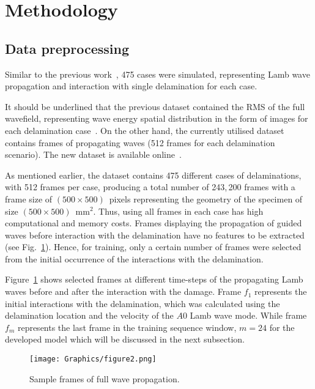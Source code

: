 \documentclass{IOS-Book-Article}
\begin{document}
\section{Methodology}

\subsection{Data preprocessing}
Similar to the previous work~\cite{Ijjeh2021}, 475 cases were simulated, representing Lamb wave propagation and interaction with single delamination for each case. 

It should be underlined that the previous dataset contained the RMS of the full wavefield, representing wave energy spatial distribution in the form of images for each delamination case~\cite{Kudela2020d}.
On the other hand, the currently utilised dataset contains frames of propagating waves (512 frames for each delamination scenario).
The new dataset is available online~\cite{Kudela2021}.

As mentioned earlier, the dataset contains 475 different cases of delaminations, with 512 frames per case, producing a total number of 243,\,200 frames with a frame size of \((500\times500)\)~pixels representing the geometry of the specimen of size \((500\times500)\)~mm\(^{2}\).
Thus, using all frames in each case has high computational and memory costs.
Frames displaying the propagation of guided waves before interaction with the delamination have no features to be extracted (see Fig.~\ref{fig:Full_wave}).
Hence, for training, only a certain number of frames were selected from the initial occurrence of the interactions with the delamination.

Figure~\ref{fig:Full_wave} shows selected frames at different time-steps of the propagating Lamb waves before and after the interaction with the damage.
Frame \(f_{1}\) represents the initial interactions with the delamination, which was calculated using the delamination location and the velocity of the \(A0\) Lamb wave mode.
While frame \(f_{m}\) represents the last frame in the training sequence window, \(m=24\) for the developed model which will be discussed in the next subsection.
\begin{figure}[!h]
	\centering
	\texttt{[image: Graphics/figure2.png]}
	\caption{Sample frames of full wave propagation.}
	\label{fig:Full_wave}
\end{figure}
\end{document}
